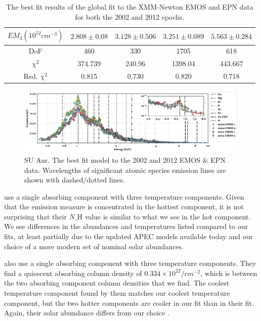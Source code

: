 \documentclass[twocolumn]{aastex631}
\begin{document}
\begin{table}[ht]
\begin{tabular}{|c|c|c|c|c|}
     $EM_3 (10^{52} cm^{-3})$    &  $2.808\pm0.08$  & $3.128\pm0.506$ & $3.251\pm0.089$ & $5.563\pm0.284$ \\
     \hline
     DoF             & 460     & 330    & 1705     & 618      \\
     $\chi^2$        & 374.739 & 240.96 & 1398.04  &  443.667 \\
     Red. $\chi^2$   & 0.815   & 0.730  & 0.820    & 0.718    \\
    \hline   
    \end{tabular}
    \caption{The best fit results of the global fit to the XMM-Newton EMOS and EPN data for both the 2002 and 2012 epochs. }
    \label{table:su_aur_fit}
\end{table}

\begin{figure}
    \centering
    \includegraphics[width=0.95\linewidth]{Figures/SU Aur/figure_global_fit_energy.pdf}
    \caption{SU Aur. The best fit model to the 2002 and 2012 EMOS \& EPN data. Wavelengths of significant atomic species emission lines are shown with dashed/dotted lines.}
    \label{fig:su_aur_fit}
\end{figure}

\citet{robrade_xmm-newton_2006} use a single absorbing component with three temperature components. Given that the emission measure is concentrated in the hottest component, it is not surprising that their $N\_{\mathrm{H}}$ value is similar to what we see in the hot component.
We see differences in the abundances and temperatures listed compared to our fits, at least partially due to the updated APEC models available today and our choice of a more modern set of nominal solar abundances.

\citet{franciosini_xmm-newton_2007} also use a single absorbing component with three temperature components.
They find a quiescent absorbing column density of $0.334\times10^{22} /cm^{-2}$, which is between the two absorbing component column densities that we find. 
The coolest temperature component found by them matches our coolest temperature component, but the two hotter components are cooler in our fit than in their fit. Again, their solar abundance \citep{anders_abundances_1989} differs from our choice \citep{asplund_chemical_2009}.
\end{document}
